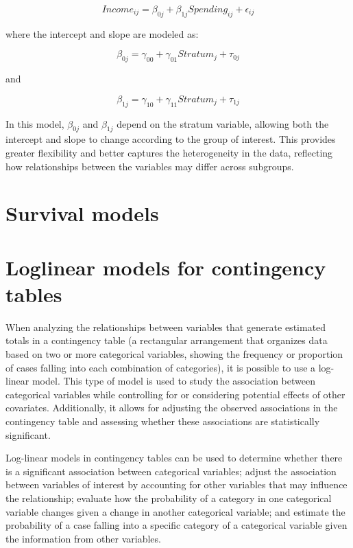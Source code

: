 \documentclass[
  12pt,
]{book}
\begin{document}
\[
Income_{ij} = \beta_{0j} + \beta_{1j} Spending_{ij} + \epsilon_{ij}
\]

where the intercept and slope are modeled as:

\[
\beta_{0j} = \gamma_{00} + \gamma_{01} Stratum_{j} + \tau_{0j}
\]

and

\[
\beta_{1j} = \gamma_{10} + \gamma_{11} Stratum_{j} + \tau_{1j}
\]

In this model, \(\beta_{0j}\) and \(\beta_{1j}\) depend on the stratum variable, allowing both the intercept and slope to change according to the group of interest. This provides greater flexibility and better captures the heterogeneity in the data, reflecting how relationships between the variables may differ across subgroups.

\hypertarget{survival-models}{%
\section{Survival models}\label{survival-models}}

\hypertarget{loglinear-models-for-contingency-tables}{%
\section{Loglinear models for contingency tables}\label{loglinear-models-for-contingency-tables}}

When analyzing the relationships between variables that generate estimated totals in a contingency table (a rectangular arrangement that organizes data based on two or more categorical variables, showing the frequency or proportion of cases falling into each combination of categories), it is possible to use a log-linear model. This type of model is used to study the association between categorical variables while controlling for or considering potential effects of other covariates. Additionally, it allows for adjusting the observed associations in the contingency table and assessing whether these associations are statistically significant.

Log-linear models in contingency tables can be used to determine whether there is a significant association between categorical variables; adjust the association between variables of interest by accounting for other variables that may influence the relationship; evaluate how the probability of a category in one categorical variable changes given a change in another categorical variable; and estimate the probability of a case falling into a specific category of a categorical variable given the information from other variables.
\end{document}
